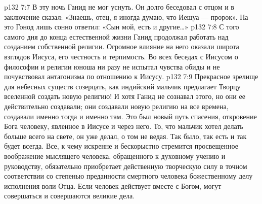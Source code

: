 \vs p132 7:7 \pc В эту ночь Ганид не мог уснуть. Он долго беседовал с отцом и в заключение сказал: «Знаешь, отец, я иногда думаю, что Иешуа --- пророк». На это Гонод лишь сонно ответил: «Сын мой, есть и другие\ldots »
\vs p132 7:8 С того самого дня до конца естественной жизни Ганид продолжал работать над созданием собственной религии. Огромное влияние на него оказали широта взглядов Иисуса, его честность и терпимость. Во всех беседах с Иисусом о философии и религии юноша ни разу не испытал чувства обиды и не почувствовал антагонизма по отношению к Иисусу.
\vs p132 7:9 \pc Прекрасное зрелище для небесных существ созерцать, как индийский мальчик предлагает Творцу вселенной создать новую религию! И хотя Ганид не сознавал этого, но они ее действительно создавали; они создавали новую религию на все времена, создавали именно тогда и именно там. Это был новый путь спасения, откровение Бога человеку, явленное в Иисусе и через него. То, что мальчик хотел делать больше всего на свете, он уже делал, о том не ведая. Так было, так есть и так будет всегда. Все, к чему искренне и бескорыстно стремится просвещенное воображение мыслящего человека, обращенного к духовному учению и руководству, обязательно приобретает действенную творческую силу в точном соответствии со степенью преданности смертного человека божественному делу исполнения воли Отца. Если человек действует вместе с Богом, могут совершаться и совершаются великие дела.
